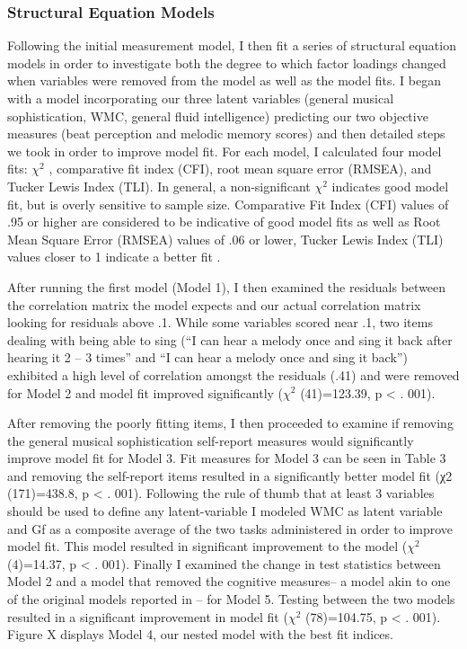 \documentclass[]{book}
\begin{document}
\hypertarget{structural-equation-models}{%
\subsubsection{Structural Equation Models}\label{structural-equation-models}}

Following the initial measurement model, I then fit a series of structural equation models in order to investigate both the degree to which factor loadings changed when variables were removed from the model as well as the model fits.
I began with a model incorporating our three latent variables (general musical sophistication, WMC, general fluid intelligence) predicting our two objective measures (beat perception and melodic memory scores) and then detailed steps we took in order to improve model fit.
For each model, I calculated four model fits: \(\chi^2\) , comparative fit index (CFI), root mean square error (RMSEA), and Tucker Lewis Index (TLI).
In general, a non-significant \(\chi^2\) indicates good model fit, but is overly sensitive to sample size.
Comparative Fit Index (CFI) values of .95 or higher are considered to be indicative of good model fits as well as Root Mean Square Error (RMSEA) values of .06 or lower, Tucker Lewis Index (TLI) values closer to 1 indicate a better fit \citep{beaujeanLatentVariableModeling2014}.

After running the first model (Model 1), I then examined the residuals between the correlation matrix the model expects and our actual correlation matrix looking for residuals above .1.
While some variables scored near .1, two items dealing with being able to sing (``I can hear a melody once and sing it back after hearing it 2 -- 3 times'' and ``I can hear a melody once and sing it back'') exhibited a high level of correlation amongst the residuals (.41) and were removed for Model 2 and model fit improved significantly (\(\chi^2\) (41)=123.39, p \textless{} . 001).

After removing the poorly fitting items, I then proceeded to examine if removing the general musical sophistication self-report measures would significantly improve model fit for Model 3.
Fit measures for Model 3 can be seen in Table 3 and removing the self-report items resulted in a significantly better model fit (χ2 (171)=438.8, p \textless{} . 001).
Following the rule of thumb that at least 3 variables should be used to define any latent-variable \citep{beaujeanLatentVariableModeling2014} I modeled WMC as latent variable and Gf as a composite average of the two tasks administered in order to improve model fit.
This model resulted in significant improvement to the model (\(\chi^2\) (4)=14.37, p \textless{} . 001).
Finally I examined the change in test statistics between Model 2 and a model that removed the cognitive measures-- a model akin to one of the original models reported in \citep{mullensiefenMusicalityNonMusiciansIndex2014}-- for Model 5.
Testing between the two models resulted in a significant improvement in model fit (\(\chi^2\) (78)=104.75, p \textless{} . 001).
Figure X displays Model 4, our nested model with the best fit indices.
\end{document}

